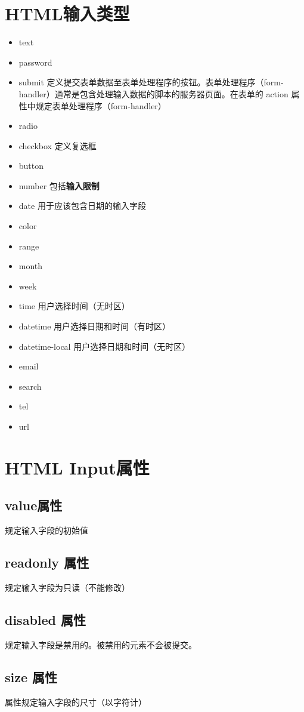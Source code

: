 \documentclass[10pt,UTF8]{ctexart}
\begin{document}
\section{HTML输入类型}
\begin{itemize}
\item text
\item password
\item submit 定义提交表单数据至表单处理程序的按钮。表单处理程序（form-handler）通常是包含处理输入数据的脚本的服务器页面。在表单的 action 属性中规定表单处理程序（form-handler）
\item radio
\item checkbox 定义复选框
\item button
\item number 包括\textbf{输入限制}
\item date  用于应该包含日期的输入字段
\item color
\item range
\item month
\item week
\item time 用户选择时间（无时区）
\item datetime 用户选择日期和时间（有时区）
\item datetime-local 用户选择日期和时间（无时区）
\item email
\item search
\item tel
\item url
\end{itemize}
\section{HTML Input属性}
\subsection{value属性}
规定输入字段的初始值
\subsection{readonly 属性}
规定输入字段为只读（不能修改）
\subsection{disabled 属性}
规定输入字段是禁用的。被禁用的元素不会被提交。
\subsection{size 属性}
属性规定输入字段的尺寸（以字符计）
\end{document}
